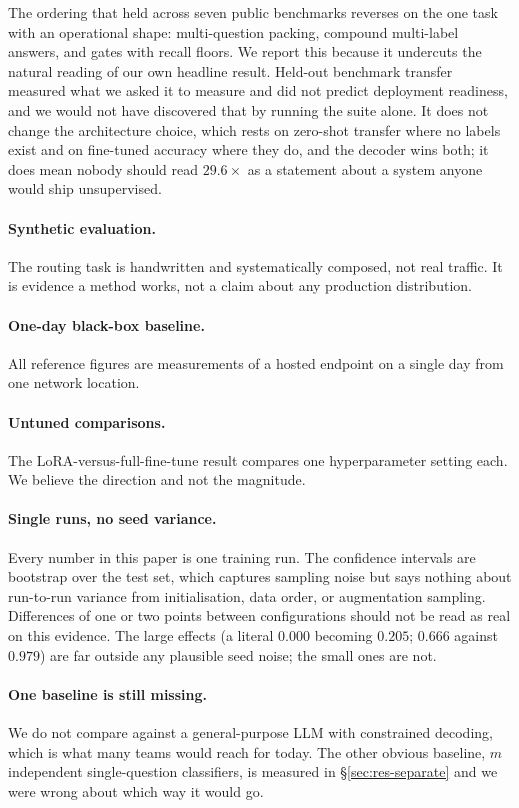 The ordering that held across seven public benchmarks reverses on the
one task with an operational shape: multi-question packing, compound
multi-label answers, and gates with recall floors. We report this because
it undercuts the natural reading of our own headline result. Held-out
benchmark transfer measured what we asked it to measure and did not
predict deployment readiness, and we would not have discovered that by
running the suite alone. It does not change the architecture choice,
which rests on zero-shot transfer where no labels exist and on fine-tuned
accuracy where they do, and the decoder wins both; it does mean nobody
should read $29.6\times$ as a statement about a system anyone would ship
unsupervised.

\paragraph{Synthetic evaluation.} The routing task is handwritten and
systematically composed, not real traffic. It is evidence a method works,
not a claim about any production distribution.

\paragraph{One-day black-box baseline.} All reference figures are
measurements of a hosted endpoint on a single day from one network
location.

\paragraph{Untuned comparisons.} The LoRA-versus-full-fine-tune result
compares one hyperparameter setting each. We believe the direction and
not the magnitude.

\paragraph{Single runs, no seed variance.} Every number in this paper is
one training run. The confidence intervals are bootstrap over the test
set, which captures sampling noise but says nothing about run-to-run
variance from initialisation, data order, or augmentation sampling.
Differences of one or two points between configurations should not be
read as real on this evidence. The large effects (a literal $0.000$
becoming $0.205$; $0.666$ against $0.979$) are far outside any plausible
seed noise; the small ones are not.

\paragraph{One baseline is still missing.} We do not compare against a
general-purpose LLM with constrained decoding, which is what many teams
would reach for today. The other obvious baseline, $m$ independent
single-question classifiers, is measured in
\S\ref{sec:res-separate} and we were wrong about which way it would go.

